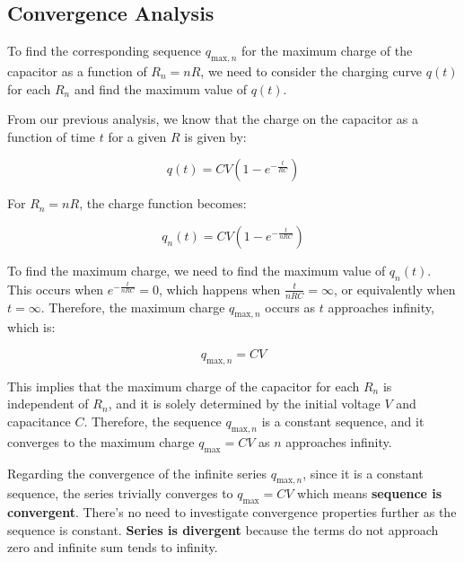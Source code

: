 \subsection{Convergence Analysis}

To find the corresponding sequence \( q_{\text{max},n} \) for the maximum charge of the capacitor as a function of \( R_n = nR \), we need to consider the charging curve \( q(t) \) for each \( R_n \) and find the maximum value of \( q(t) \).

From our previous analysis, we know that the charge on the capacitor as a function of time \( t \) for a given \( R \) is given by:

\[ q(t) = CV(1 - e^{-\frac{t}{RC}}) \]

For \( R_n = nR \), the charge function becomes:

\[ q_n(t) = CV(1 - e^{-\frac{t}{nRC}}) \]

To find the maximum charge, we need to find the maximum value of \( q_n(t) \). This occurs when \( e^{-\frac{t}{nRC}} = 0 \), which happens when \( \frac{t}{nRC} = \infty \), or equivalently when \( t = \infty \). Therefore, the maximum charge \( q_{\text{max},n} \) occurs as \( t \) approaches infinity, which is:

\[ q_{\text{max},n} = CV \]

This implies that the maximum charge of the capacitor for each \( R_n \) is independent of \( R_n \), and it is solely determined by the initial voltage \( V \) and capacitance \( C \). Therefore, the sequence \( q_{\text{max},n} \) is a constant sequence, and it converges to the maximum charge \( q_{\text{max}} = CV \) as \( n \) approaches infinity.

Regarding the convergence of the infinite series \( q_{\text{max},n} \), since it is a constant sequence, the series trivially converges to \( q_{\text{max}} = CV \) which means \textbf{sequence is convergent}. There's no need to investigate convergence properties further as the sequence is constant. \textbf{Series is divergent} because the terms do not approach zero and infinite sum tends to infinity.


